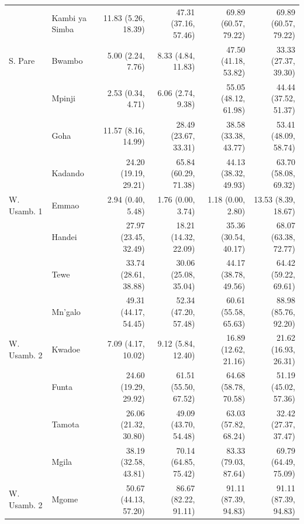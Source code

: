 \begin{table}[ht!]
\begin{adjustbox}{width=1\linewidth}
\begin{tabular}{llrrrr}
                          &   Kambi ya Simba  &   11.83 (5.26, 18.39)    & 47.31 (37.16, 57.46)   & 69.89 (60.57, 79.22)   & 69.89 (60.57, 79.22)   \\
\cmidrule{2-6}
S. Pare                   &   Bwambo          &   5.00 (2.24, 7.76)      & 8.33 (4.84, 11.83)     & 47.50 (41.18, 53.82)   & 33.33 (27.37, 39.30)   \\
                          &   Mpinji          &   2.53 (0.34, 4.71)      & 6.06 (2.74, 9.38)      & 55.05 (48.12, 61.98)   & 44.44 (37.52, 51.37)   \\
                          &   Goha            &   11.57 (8.16, 14.99)    & 28.49 (23.67, 33.31)   & 38.58 (33.38, 43.77)   & 53.41 (48.09, 58.74)   \\
                          &   Kadando         &   24.20 (19.19, 29.21)   & 65.84 (60.29, 71.38)   & 44.13 (38.32, 49.93)   & 63.70 (58.08, 69.32)   \\
\cmidrule{2-6}
W. Usamb. 1               &   Emmao           &   2.94 (0.40, 5.48)      & 1.76 (0.00, 3.74)      & 1.18 (0.00, 2.80)      & 13.53 (8.39, 18.67)    \\
                          &   Handei          &   27.97 (23.45, 32.49)   & 18.21 (14.32, 22.09)   & 35.36 (30.54, 40.17)   & 68.07 (63.38, 72.77)   \\
                          &   Tewe            &   33.74 (28.61, 38.88)   & 30.06 (25.08, 35.04)   & 44.17 (38.78, 49.56)   & 64.42 (59.22, 69.61)   \\
                          &   Mn'galo         &   49.31 (44.17, 54.45)   & 52.34 (47.20, 57.48)   & 60.61 (55.58, 65.63)   & 88.98 (85.76, 92.20)   \\
\cmidrule{2-6}
W. Usamb. 2               &   Kwadoe          &   7.09 (4.17, 10.02)     & 9.12 (5.84, 12.40)     & 16.89 (12.62, 21.16)   & 21.62 (16.93, 26.31)   \\
                          &   Funta           &   24.60 (19.29, 29.92)   & 61.51 (55.50, 67.52)   & 64.68 (58.78, 70.58)   & 51.19 (45.02, 57.36)   \\
                          &   Tamota          &   26.06 (21.32, 30.80)   & 49.09 (43.70, 54.48)   & 63.03 (57.82, 68.24)   & 32.42 (27.37, 37.47)   \\
                          &   Mgila           &   38.19 (32.58, 43.81)   & 70.14 (64.85, 75.42)   & 83.33 (79.03, 87.64)   & 69.79 (64.49, 75.09)   \\
\cmidrule{2-6}
W. Usamb. 2               &   Mgome           &   50.67 (44.13, 57.20)   & 86.67 (82.22, 91.11)   & 91.11 (87.39, 94.83)   & 91.11 (87.39, 94.83)   \\
\bottomrule
\end{tabular}
\end{adjustbox}
\end{table}
\makeatother
























